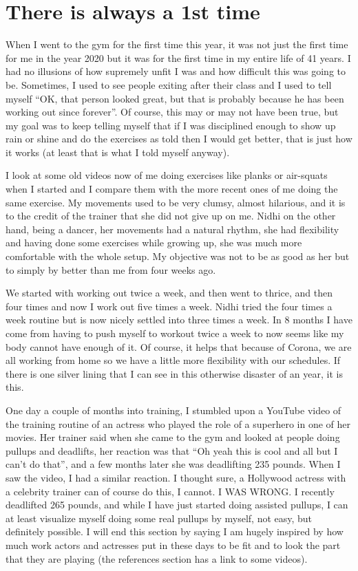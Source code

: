 \documentclass[
  oneside]{book}
\begin{document}
\hypertarget{there-is-always-a-1st-time}{%
\section{There is always a 1st time}\label{there-is-always-a-1st-time}}

When I went to the gym for the first time this year, it was not just the first time for me in the year 2020 but it was for the first time in my entire life of 41 years. I had no illusions of how supremely unfit I was and how difficult this was going to be. Sometimes, I used to see people exiting after their class and I used to tell myself ``OK, that person looked great, but that is probably because he has been working out since forever''. Of course, this may or may not have been true, but my goal was to keep telling myself that if I was disciplined enough to show up rain or shine and do the exercises as told then I would get better, that is just how it works (at least that is what I told myself anyway).

I look at some old videos now of me doing exercises like planks or air-squats when I started and I compare them with the more recent ones of me doing the same exercise. My movements used to be very clumsy, almost hilarious, and it is to the credit of the trainer that she did not give up on me. Nidhi on the other hand, being a dancer, her movements had a natural rhythm, she had flexibility and having done some exercises while growing up, she was much more comfortable with the whole setup. My objective was not to be as good as her but to simply by better than me from four weeks ago.

We started with working out twice a week, and then went to thrice, and then four times and now I work out five times a week. Nidhi tried the four times a week routine but is now nicely settled into three times a week. In 8 months I have come from having to push myself to workout twice a week to now seems like my body cannot have enough of it. Of course, it helps that because of Corona, we are all working from home so we have a little more flexibility with our schedules. If there is one silver lining that I can see in this otherwise disaster of an year, it is this.

One day a couple of months into training, I stumbled upon a YouTube video of the training routine of an actress who played the role of a superhero in one of her movies. Her trainer said when she came to the gym and looked at people doing pullups and deadlifts, her reaction was that ``Oh yeah this is cool and all but I can't do that'', and a few months later she was deadlifting 235 pounds. When I saw the video, I had a similar reaction. I thought sure, a Hollywood actress with a celebrity trainer can of course do this, I cannot. I WAS WRONG. I recently deadlifted 265 pounds, and while I have just started doing assisted pullups, I can at least visualize myself doing some real pullups by myself, not easy, but definitely possible. I will end this section by saying I am hugely inspired by how much work actors and actresses put in these days to be fit and to look the part that they are playing (the references section has a link to some videos).
\end{document}
